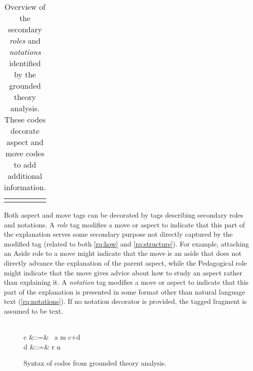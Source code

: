 \documentclass[sigconf]{acmart}
\newcommand{\OR}{\OB{\hspace{1.5ex}|\hspace{1.5ex}}}
\newcommand{\Push}{\OB{\Rightarrow}}
\newcommand{\Pop}{\OB{\Leftarrow}}
\begin{document}
\begin{table}
\begin{tabular}{ll}

\\[-1.5ex]

\\[-1.5ex]
\end{tabular}
\caption{Overview of the secondary \emph{roles} and \emph{notations} identified
by the grounded theory analysis. These codes decorate aspect and move codes to
add additional information.}
\label{tbl:codes:dec}
\end{table}


Both aspect and move tags can be decorated by tags describing secondary roles
and notations.
%
A \emph{role} tag modifies a move or aspect to indicate that this part of the
explanation serves some secondary purpose not directly captured by the modified
tag (related to both \ref{rq:how} and \ref{rq:structure}). For example,
attaching an Aside role to a move might indicate that the move is an aside that
does not directly advance the explanation of the parent aspect, while the
Pedagogical role might indicate that the move gives advice about how to study
an aspect rather than explaining it.
%
A \emph{notation} tag modifies a move or aspect to indicate that this part of
the explanation is presented in some format other than natural language text
(\ref{rq:notations}). If no notation decorator is provided, the tagged fragment
is assumed to be text.


\begin{figure}
\begin{syntax}
 \\
c\in{}
 &::=& \Push~a
 \OR \!\Pop\!
 \OR m
 \OR c+d \\
d\in{}
 &::=& r \OR n
\end{syntax}

\vspace{-1.5ex}
\caption{Syntax of codes from grounded theory analysis.}
\label{fig:codes:syntax}
\end{figure}
\end{document}
